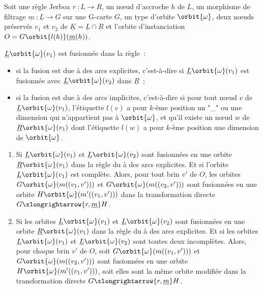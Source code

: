 \begin{proposition}
	Soit une règle Jerboa $r~: L \longrightarrow R$, un nœud d'accroche $h$ de $L$, un morphisme
	de filtrage $\underline{m}~: \underline{L} \rightarrow G$ sur une G-carte $G$, un type
	d'orbite $\orbit{\omega}$, deux n\oe uds préservés $v_1$ et $v_2$ de
	$\underline{K} = \underline{L} \cap \underline{R}$ et l'orbite d'instanciation
	$O = G\orbit{l(h)}(\underline{m}(h))$. %

	$\underline{L}\orbit{\omega}(v_1)$ est fusionnée dans la règle~:

	\begin{itemize}
		\item si la fusion est due à des arcs explicites, c'est-à-dire si
		      $\underline{L}\orbit{\omega}(v_1)$ est fusionnée avec
		      $\underline{L}\orbit{\omega}(v_2)$ dans $\underline{R}$~;

		\item si la fusion est due à des arcs implicites, c'est-à-dire si pour tout
		      nœud $v$ de $\underline{L}\orbit{\omega}(v_1)$, l'étiquette $l(v)$ a pour
		      $k$-ème position un "\_" ou une dimension qui n'appartient pas à
		      $\orbit{\omega}$, et qu'il existe un nœud $w$ de
		      $\underline{R}\orbit{\omega}(v_1)$ dont l'étiquette $l(w)$ a pour $k$-ème
		      position une dimension de $\orbit{\omega}$.
	\end{itemize}

	\begin{enumerate}
		\item Si $\underline{L}\orbit{\omega}(v_1)$ et $\underline{L}\orbit{\omega}(v_2)$ sont
		      fusionnées en une orbite $\underline{R}\orbit{\omega}(v_1)$ dans la règle
		      du à des arcs explicites. Et si l'orbite $\underline{L}\orbit{\omega}(v_1)$
		      est complète. %
		      Alors, pour tout brin $v'$ de $O$, les orbites
		      $G\orbit{\omega}(m((v_1,v')))$ et $G\orbit{\omega}(m((v_2,v')))$ sont fusionnées
		      en une orbite $H\orbit{\omega}(m'((v_1,v')))$ dans la transformation
		      directe $G \xlongrightarrow{r,\underline{m}} H$.

		\item Si les orbites $\underline{L}\orbit{\omega}(v_1)$ et
		      $\underline{L}\orbit{\omega}(v_2)$ sont fusionnées en une orbite
		      $\underline{R}\orbit{\omega}(v_1)$ dans la règle du à des arcs explicites.
		      Et si les orbites $\underline{L}\orbit{\omega}(v_1)$ et
		      $\underline{L}\orbit{\omega}(v_2)$ sont toutes deux incomplètes. %
		      Alors, pour chaque brin $v'$ de $O$, soit $G\orbit{\omega}(m((v_1,v')))$ et
		      $G\orbit{\omega}(m((v_2,v')))$ sont fusionnées en une orbite
		      $H\orbit{\omega}(m'((v_1,v')))$, soit elles sont la même orbite modifiée
		      dans la transformation directe
		      $G \xlongrightarrow{r, \underline{m}} H$.


\end{enumerate}
\end{proposition}
